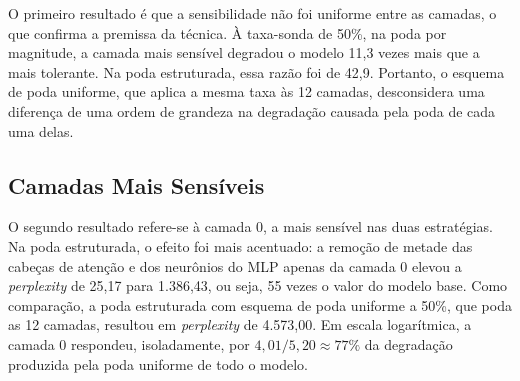 O primeiro resultado é que a sensibilidade não foi uniforme entre as camadas, o que confirma a
premissa da técnica. À taxa-sonda de 50\%, na poda por magnitude, a camada mais sensível
degradou o modelo 11,3 vezes mais que a mais tolerante. Na poda estruturada, essa razão foi de
42,9. Portanto, o esquema de poda uniforme, que aplica a mesma taxa às 12 camadas, desconsidera
uma diferença de uma ordem de grandeza na degradação causada pela poda de cada uma delas.

\subsection{Camadas Mais Sensíveis}\label{subsec:camada_zero}

O segundo resultado refere-se à camada 0, a mais sensível nas duas estratégias. Na poda
estruturada, o efeito foi mais acentuado: a remoção de metade das cabeças de atenção e dos
neurônios do MLP apenas da camada 0 elevou a \textit{perplexity} de 25,17 para 1.386,43, ou
seja, 55 vezes o valor do modelo base. Como comparação, a poda estruturada com esquema de poda
uniforme a 50\%, que poda as 12 camadas, resultou em \textit{perplexity} de 4.573,00. Em escala
logarítmica, a camada 0 respondeu, isoladamente, por $4{,}01/5{,}20 \approx 77\%$ da degradação
produzida pela poda uniforme de todo o modelo.

